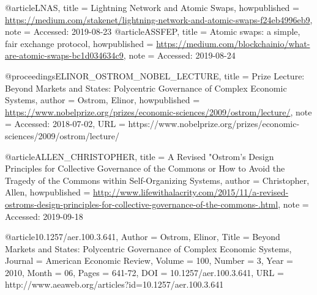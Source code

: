 
@article{LNAS,
  title = {Lightning Network and Atomic Swaps},
  howpublished = {\url{https://medium.com/stakenet/lightning-network-and-atomic-swaps-f24eb4996eb9}},
  note = {Accessed: 2019-08-23}
}
@article{ASSFEP,
  title = {Atomic swaps: a simple, fair exchange protocol},
  howpublished = {\url{https://medium.com/blockchainio/what-are-atomic-swaps-bc1d034634c9}},
  note = {Accessed: 2019-08-24}
}

@proceedings{ELINOR_OSTROM_NOBEL_LECTURE,
  title = {Prize Lecture: Beyond Markets and States: Polycentric Governance of Complex Economic Systems},
  author = {Ostrom, Elinor},
  howpublished = {\url{https://www.nobelprize.org/prizes/economic-sciences/2009/ostrom/lecture/}},
  note = {Accessed: 2018-07-02},
  URL = {https://www.nobelprize.org/prizes/economic-sciences/2009/ostrom/lecture/}
}

@article{ALLEN_CHRISTOPHER,
  title = {A Revised "Ostrom's Design Principles for Collective Governance of the Commons or How to Avoid the Tragedy of the Commons within Self-Organizing Systems},
  author = {Christopher, Allen},
  howpublished = {\url{http://www.lifewithalacrity.com/2015/11/a-revised-ostroms-design-principles-for-collective-governance-of-the-commons-.html}},
  note = {Accessed: 2019-09-18}
}

@article{10.1257/aer.100.3.641,
Author = {Ostrom, Elinor},
Title = {Beyond Markets and States: Polycentric Governance of Complex Economic Systems},
Journal = {American Economic Review},
Volume = {100},
Number = {3},
Year = {2010},
Month = {06},
Pages = {641-72},
DOI = {10.1257/aer.100.3.641},
URL = {http://www.aeaweb.org/articles?id=10.1257/aer.100.3.641}}


